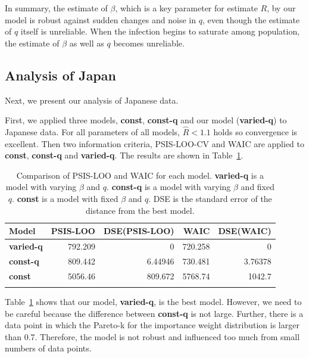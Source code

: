 \documentclass{amsart}
\begin{document}
In summary, the estimate of $\beta$, which is a key parameter for estimate $R$, by our model is robust against sudden changes and noise in $q$, even though the estimate of $q$ itself is unreliable.
When the infection begins to saturate among population, the estimate of $\beta$ as well as $q$ becomes unreliable.

\subsection{Analysis of Japan}

Next, we present our analysis of Japanese data.

First, we applied three models, \textbf{const}, \textbf{const-q} and our model (\textbf{varied-q}) to Japanese data.
For all parameters of all models, $\hat{R} < 1.1$ holds so convergence is excellent.
Then two information criteria, PSIS-LOO-CV and WAIC are applied to \textbf{const}, \textbf{const-q} and \textbf{varied-q}.
The results are shown in Table~\ref{tbl:IC}.

\begin{table}[h]
 \begin{center}
 \begin{tabular}{lrrrr} \toprule
 Model & PSIS-LOO & DSE(PSIS-LOO) & WAIC & DSE(WAIC) \\ \midrule 
 \textbf{varied-q} & 792.209 & 0 & 720.258 & 0 \\
 \textbf{const-q} & 809.442 & 6.44946 & 730.481 & 3.76378\\
 \textbf{const} & 5056.46 & 809.672 & 5768.74 & 1042.7\\ 
 \bottomrule\\
 \end{tabular}
 \caption{Comparison of PSIS-LOO and WAIC for each model. \textbf{varied-q} is a model with varying $\beta$ and $q$. \textbf{const-q} is a model with varying $\beta$ and fixed $q$. \textbf{const} is a model with fixed $\beta$ and $q$.
 DSE is the standard error of the distance from the best model.}
 \label{tbl:IC}
 \end{center}
\end{table}

Table~\ref{tbl:IC} shows that our model, \textbf{varied-q}, is the best model.
However, we need to be careful because the difference between \textbf{const-q} is not large.
Further, there is a data point in which the Pareto-k for the importance weight distribution is larger than 0.7.
Therefore, the model is not robust and influenced too much from small numbers of data points.
\end{document}

